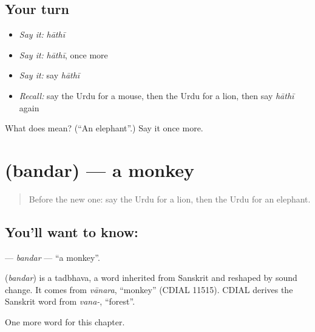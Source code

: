 \subsection*{Your turn}
\begin{itemize}
\raggedright
  \item \emph{Say it:} \emph{hāthī}
  \item \emph{Say it:} \emph{hāthī}, once more
  \item \emph{Say it:} say \emph{hāthī}
  \item \emph{Recall:} say the Urdu for a mouse, then the Urdu for a lion, then say \emph{hāthī} again
\end{itemize}

\begin{tcolorbox}[breakable,colback=teal!4,colframe=teal!35!black,title={Before you move on}]
What does  mean? (\textquotedblleft{}An elephant\textquotedblright{}.) Say it once more.
\end{tcolorbox}
\section[\texorpdfstring{\ur{بندر} (bandar)}{بندر (bandar)}]{ (bandar) — a monkey}

\label{lesson:UR-C69-bandar}



\begin{quote}
Before the new one: say the Urdu for a lion, then the Urdu for an elephant.
\end{quote}

\subsection*{You'll want to know: }
\textbf{} — \emph{bandar} — \textquotedblleft{}a monkey\textquotedblright{}.

\begin{cousinweb}
\textbf{} (\emph{bandar}) is a tadbhava, a word inherited from Sanskrit and reshaped by sound change. It comes from \emph{vānara}, \textquotedblleft{}monkey\textquotedblright{} (CDIAL 11515). CDIAL derives the Sanskrit word from \emph{vana-}, \textquotedblleft{}forest\textquotedblright{}.
\end{cousinweb}

\begin{grammarlens}[title={What you've built}]
One more word for this chapter.
\end{grammarlens}

